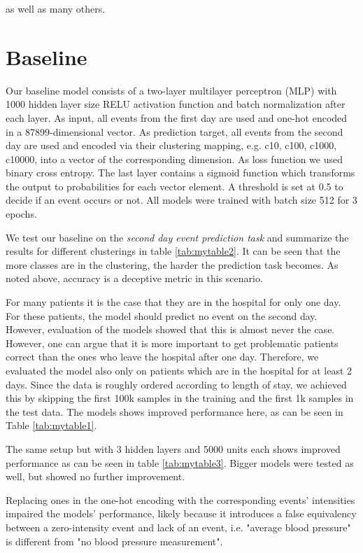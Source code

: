 as well as many others.

\newpage
\section{Baseline}
\label{sec:baseline}

Our baseline model consists of a two-layer multilayer perceptron (MLP) with 1000 hidden layer size RELU \cite{agarapDeepLearningUsing2018} activation function and batch normalization after each layer. As input, all events from the first day are used and one-hot encoded in a 87899-dimensional vector. As prediction target, all events from the second day are used and encoded via their clustering mapping, e.g. c10, c100, c1000, c10000, into a vector of the corresponding dimension. As loss function we used binary cross entropy. The last layer contains a sigmoid function which transforms the output to probabilities for each vector element. A threshold is set at 0.5 to decide if an event occurs or not. All models were trained with batch size 512 for 3 epochs.

We test our baseline on the \emph{second day event prediction task} and summarize the results for different clusterings in table \ref{tab:mytable2}. It can be seen that the more classes are in the clustering, the harder the prediction task becomes. As noted above, accuracy is a deceptive metric in this scenario.

For many patients it is the case that they are in the hospital for only one day. For these patients, the model should predict no event on the second day. However, evaluation of the models showed that this is almost never the case. However, one can argue that it is more important to get problematic patients correct than the ones who leave the hospital after one day. Therefore, we evaluated the model also only on patients which are in the hospital for at least 2 days. Since the data is roughly ordered according to length of stay, we achieved this by skipping the first 100k samples in the training and the first 1k samples in the test data. The models shows improved performance here, as can be seen in Table \ref{tab:mytable1}.


The same setup but with 3 hidden layers and 5000 units each shows improved performance as can be seen in table \ref{tab:mytable3}. Bigger models were tested as well, but showed no further improvement.


Replacing ones in the one-hot encoding with the corresponding events' intensities impaired the models' performance, likely because it introduces a false equivalency between a zero-intensity event and lack of an event, i.e. "average blood pressure" is different from "no blood pressure measurement".


